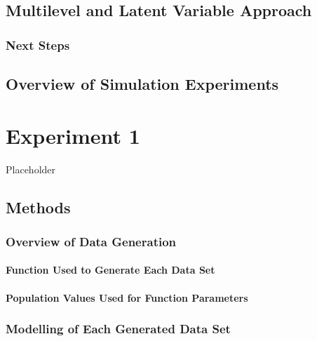 \documentclass[
12pt, %
twoside,
english]{guelphthesis}
\begin{document}
\hypertarget{multilevel-and-latent-variable-approach}{%
\section{Multilevel and Latent Variable Approach}\label{multilevel-and-latent-variable-approach}}

\hypertarget{next-steps}{%
\subsection{Next Steps}\label{next-steps}}

\hypertarget{overview-of-simulation-experiments}{%
\section{Overview of Simulation Experiments}\label{overview-of-simulation-experiments}}

\hypertarget{exp-1}{%
\chapter{Experiment 1}\label{exp-1}}

Placeholder

\hypertarget{methods}{%
\section{Methods}\label{methods}}

\hypertarget{data-generation}{%
\subsection{Overview of Data Generation}\label{data-generation}}

\hypertarget{function-used-to-generate-each-data-set}{%
\subsubsection{Function Used to Generate Each Data Set}\label{function-used-to-generate-each-data-set}}

\hypertarget{population-values-used-for-function-parameters}{%
\subsubsection{Population Values Used for Function Parameters}\label{population-values-used-for-function-parameters}}

\hypertarget{data-modelling}{%
\subsection{Modelling of Each Generated Data Set}\label{data-modelling}}
\end{document}
